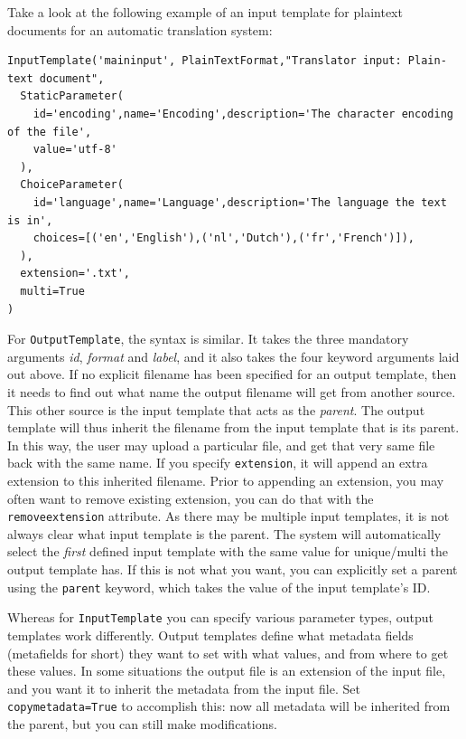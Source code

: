 \documentclass[a4paper,12pt]{report}
\begin{document}
Take a look at the following example of an input template for plaintext documents for an automatic translation system:

{\footnotesize{
\begin{verbatim}
InputTemplate('maininput', PlainTextFormat,"Translator input: Plain-text document",  
  StaticParameter(
    id='encoding',name='Encoding',description='The character encoding of the file', 
    value='utf-8'
  ),  
  ChoiceParameter(
    id='language',name='Language',description='The language the text is in', 
    choices=[('en','English'),('nl','Dutch'),('fr','French')]),
  ),      
  extension='.txt',
  multi=True
)
\end{verbatim}
}}


For \texttt{OutputTemplate}, the syntax is similar. It takes the three
mandatory arguments \emph{id}, \emph{format} and \emph{label}, and it also
takes the four keyword arguments laid out above. If no explicit filename has
been specified for an output template, then it needs to find out what name the
output filename will get from another source. This other source is the input
template that acts as the \emph{parent}. The output template will thus inherit
the filename from the input template that is its parent. In this way, the user
may upload a particular file, and get that very same file back with the same
name. If you specify \texttt{extension}, it will append an extra extension to
this inherited filename. Prior to appending an extension, you may often want to
remove existing extension, you can do that with the \texttt{removeextension}
attribute. 
As there may be multiple input templates, it is not always clear what input
template is the parent. The system will automatically select the \emph{first}
defined input template with the same value for unique/multi the output template
has. If this is not what you want, you can explicitly set a parent using the
\texttt{parent} keyword, which takes the value of the input template's ID.

Whereas for \texttt{InputTemplate} you can specify various parameter types,
output templates work differently. Output templates define what metadata fields
(metafields for short) they want to set with what values, and from where to get
these values. In some situations the output file is an extension of the input
file, and you want it to inherit the metadata from the input file. Set
\texttt{copymetadata=True} to accomplish this: now all metadata will be
inherited from the parent, but you can still make modifications.
\end{document}
